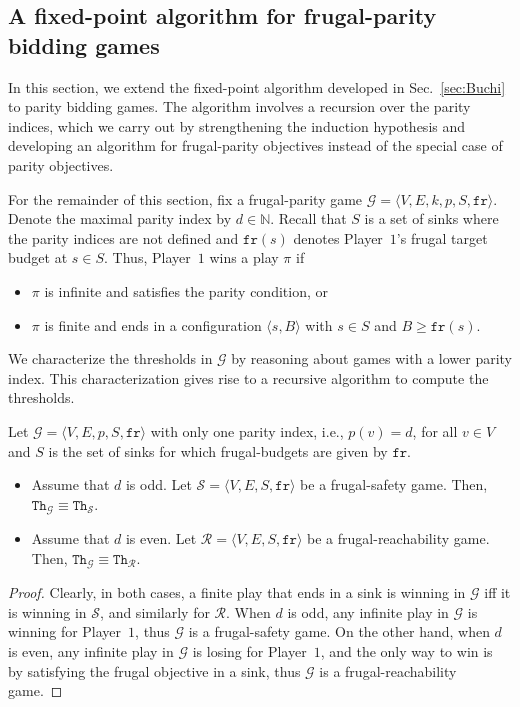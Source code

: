\documentclass{article}\providecommand{\nequiv}{\not\equiv}\usepackage[a4paper,margin=20mm]{geometry}
\newcommand{\PO}{Player~$1$\xspace}
\newcommand{\G}{{\mathcal G}}
\newcommand{\R}{{\mathcal R}}
\renewcommand{\S}{{\mathcal S}}
\newcommand{\fr}{\texttt{fr}}
\newcommand{\Nat}{\mathbb{N}}
\newcommand{\thresh}{\texttt{Th}\xspace}
\newcommand{\zug}[1]{\langle #1  \rangle}
\begin{document}
\subsection{A fixed-point algorithm for frugal-parity bidding games}
In this section, we extend the fixed-point algorithm developed in Sec.~\ref{sec:Buchi} to parity bidding games. The algorithm involves a recursion over the parity indices, which we carry out by strengthening the induction hypothesis and developing an algorithm for frugal-parity objectives instead of the special case of parity objectives. 

For the remainder of this section, fix a frugal-parity game $\G = \zug{V, E, k, p, S, \fr}$. Denote the maximal parity index by $d \in \Nat$. 
Recall that $S$ is a set of sinks where the parity indices are not defined and $\fr(s)$ denotes \PO's frugal target budget at $s \in S$. Thus, \PO wins a play $\pi$ if 
\begin{itemize}
\item $\pi$ is infinite and satisfies the parity condition, or 
\item $\pi$ is finite and ends in a configuration $\zug{s, B}$ with $s \in S$ and $B \geq \fr(s)$.
\end{itemize}

We characterize the thresholds in $\G$ by reasoning about games with a lower parity index. This characterization gives rise to a recursive algorithm to compute the thresholds.


\begin{lemma}
Let $\G = \zug{V, E, p, S, \fr}$ with only one parity index, i.e., $p(v) = d$, for all $v \in V$ and \(S\) is the set of sinks for which frugal-budgets are given by \(\fr\). 
\begin{itemize}
\item Assume that $d$ is odd. Let $\S = \zug{V, E, S, \fr}$ be a frugal-safety game. Then, $\thresh_\G \equiv \thresh_\S$. 
\item Assume that $d$ is even. Let $\R = \zug{V, E, S, \fr}$ be a frugal-reachability game. Then, $\thresh_\G \equiv \thresh_\R$. 
\end{itemize}
\end{lemma}
\begin{proof}
Clearly, in both cases, a finite play that ends in a sink is winning in $\G$ iff it is winning in $\S$, and similarly for $\R$. 
When $d$ is odd, any infinite play in $\G$ is winning for \PO, thus $\G$ is a frugal-safety game. On the other hand, when $d$ is even, any infinite play in $\G$ is losing for \PO, and the only way to win is by satisfying the frugal objective in a sink, thus $\G$ is a frugal-reachability game. 
\end{proof}
\end{document}
